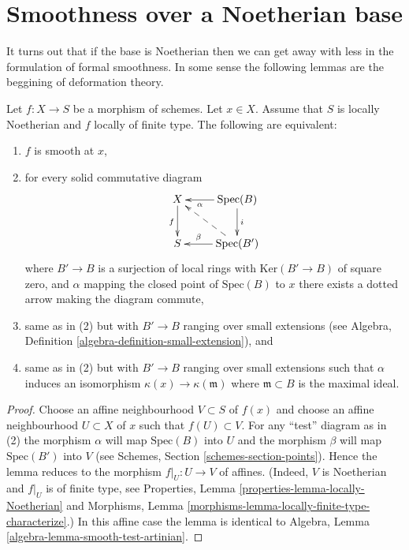 \section{Smoothness over a Noetherian base}
\label{section-smooth-Noetherian}

\noindent
It turns out that if the base is Noetherian then we can get away with
less in the formulation of formal smoothness. In some sense the following
lemmas are the beggining of deformation theory.

\begin{lemma}
\label{lemma-lifting-along-artinian-at-point}
Let $f : X \to S$ be a morphism of schemes.
Let $x \in X$.
Assume that $S$ is locally Noetherian and $f$ locally of finite type.
The following are equivalent:
\begin{enumerate}
\item $f$ is smooth at $x$,
\item for every solid commutative diagram
$$
\xymatrix{
X \ar[d]_f & \text{Spec}(B) \ar[d]^i \ar[l]^-\alpha \\
S & \text{Spec}(B') \ar[l]_-{\beta} \ar@{-->}[lu]
}
$$
where $B' \to B$ is a surjection of local rings with
$\text{Ker}(B' \to B)$ of square zero, and $\alpha$ mapping the
closed point of $\text{Spec}(B)$ to $x$ there exists
a dotted arrow making the diagram commute,
\item same as in (2) but with $B' \to B$ ranging over small
extensions (see Algebra, Definition \ref{algebra-definition-small-extension}),
and
\item same as in (2) but with $B' \to B$ ranging over small
extensions such that $\alpha$ induces an isomorphism
$\kappa(x) \to \kappa(\mathfrak m)$ where $\mathfrak m \subset B$
is the maximal ideal.
\end{enumerate}
\end{lemma}

\begin{proof}
Choose an affine neighbourhood $V \subset S$ of $f(x)$ and choose an
affine neighbourhood $U \subset X$ of $x$ such that $f(U) \subset V$.
For any ``test'' diagram as in (2) the morphism $\alpha$ will map
$\text{Spec}(B)$ into $U$ and the morphism $\beta$ will map $\text{Spec}(B')$
into $V$ (see Schemes, Section \ref{schemes-section-points}).
Hence the lemma reduces to the morphism $f|_U : U \to V$ of affines.
(Indeed, $V$ is Noetherian and $f|_U$ is of finite type, see
Properties, Lemma \ref{properties-lemma-locally-Noetherian} and
Morphisms, Lemma \ref{morphisms-lemma-locally-finite-type-characterize}.)
In this affine case the lemma is identical to
Algebra, Lemma \ref{algebra-lemma-smooth-test-artinian}.
\end{proof}

